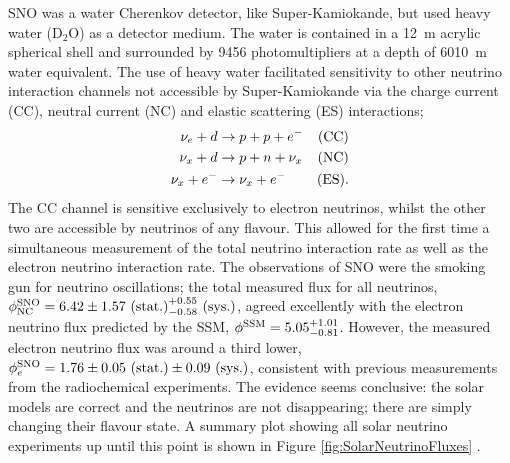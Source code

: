SNO was a water Cherenkov detector, like Super-Kamiokande, but used heavy water (D$_2$O) as a detector medium.  The water is contained in a 12~m acrylic spherical shell and surrounded by 9456 photomultipliers at a depth of 6010~m water equivalent.  The use of heavy water facilitated sensitivity to other neutrino interaction channels not accessible by Super-Kamiokande via the charge current (CC), neutral current (NC) and elastic scattering (ES) interactions;
\begin{align}
  \nu_e + d &\rightarrow p + p + e^- &\textnormal{(CC)} \\
  \nu_x + d &\rightarrow p + n + \nu_x &\textnormal{(NC)} \\
  \nu_x + e^- &\rightarrow \nu_x + e^- &\textnormal{(ES)}.
\end{align}
The CC channel is sensitive exclusively to electron neutrinos, whilst the other two are accessible by neutrinos of any flavour.  This allowed for the first time a simultaneous measurement of the total neutrino interaction rate as well as the electron neutrino interaction rate.  The observations of SNO were the smoking gun for neutrino oscillations; the total measured flux for all neutrinos, $\phi_{\textnormal{NC}}^{\textnormal{SNO}} = 6.42 \pm 1.57 \textnormal{ (stat.)} ^{+0.55}_{-0.58} \textnormal{ (sys.)}$, agreed excellently with the electron neutrino flux predicted by the SSM, $\phi^{\textnormal{SSM}} = 5.05 ^{+1.01}_{-0.81}$.  However, the measured electron neutrino flux was around a third lower, $\phi_e^{\textnormal{SNO}} = 1.76 \pm 0.05 \textnormal{ (stat.)} \pm 0.09 \textnormal{ (sys.)}$, consistent with previous measurements from the radiochemical experiments.  The evidence seems conclusive: the solar models are correct and the neutrinos are not disappearing; there are simply changing their flavour state.  A summary plot showing all solar neutrino experiments up until this point is shown in Figure \ref{fig:SolarNeutrinoFluxes} \cite{Bahcall2005Fluxes}.

